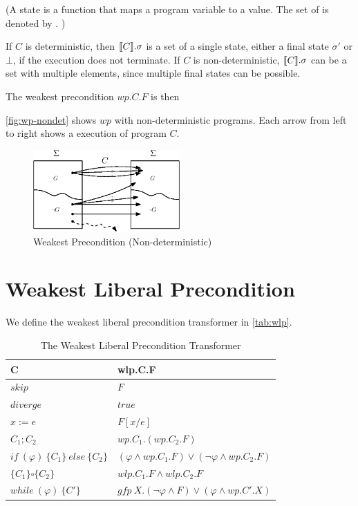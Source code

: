 (A state is a function that maps a program variable to a value. The set of  is denoted by . )

If $C$ is deterministic, then $\llbracket {C} \rrbracket.\sigma$ is a set of a single state, either a final state $\sigma'$ or $\bot$, if the execution does not terminate. 
If $C$ is non-deterministic, $\llbracket {C} \rrbracket.\sigma$ can be a set with multiple elements, since multiple final states can be possible. 

The weakest precondition $wp.C.F$ is then 


\autoref{fig:wp-nondet} shows $wp$ with non-deterministic programs. 
Each arrow from left to right shows a  execution of program $C$. 

\begin{figure}[ht!]\centering
\includegraphics[width=0.5\textwidth]{image/wp-nondet.eps}
\caption{Weakest Precondition (Non-deterministic)}
\label{fig:wp-nondet}
\end{figure}








\section{Weakest Liberal Precondition}
We define the weakest liberal precondition transformer in \autoref{tab:wlp}. 
\begin{table}[ht!]\centering
    \begin{tabular}{ll}
    \hline\hline
      \textbf{C}&\textbf{wlp.C.F}    \\ \hline
      $skip$&   $F$   \\
      $diverge$&  $true$\\
      $x:= e $&  $F[x/e]$\\
      $C_1;C_2$&  $wp.C_1.(wp.C_2.F)$\\
      $if\ (\varphi)\ \{C_1\}\ else\ \{C_2\} $&  $(\varphi\wedge wp.C_1.F)\vee(\neg\varphi\wedge wp.C_2.F)$\\
      $\{C_1\}\square \{C_2\}$ & $wlp.C_1.F\wedge wlp.C_2.F$\\
      $while\ (\varphi)\ \{C'\}$&  $gfp\ X.(\neg\varphi\wedge F)\vee(\varphi\wedge wp.C'.X)$\\
      \hline\hline
    \end{tabular}
    \caption{The Weakest Liberal Precondition Transformer}
    \label{tab:wlp}
\end{table}

